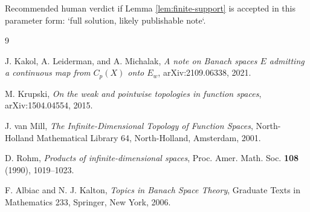 \documentclass[11pt]{article}
\begin{document}
Recommended human verdict if Lemma \ref{lem:finite-support} is accepted in
this parameter form: `full solution, likely publishable note`.

\begin{thebibliography}{9}

J. Kakol, A. Leiderman, and A. Michalak,
\emph{A note on Banach spaces $E$ admitting a continuous map from $C_p(X)$
onto $E_w$}, arXiv:2109.06338, 2021.

M. Krupski,
\emph{On the weak and pointwise topologies in function spaces},
arXiv:1504.04554, 2015.

J. van Mill,
\emph{The Infinite-Dimensional Topology of Function Spaces},
North-Holland Mathematical Library 64, North-Holland, Amsterdam, 2001.

D. Rohm,
\emph{Products of infinite-dimensional spaces},
Proc. Amer. Math. Soc. \textbf{108} (1990), 1019--1023.

F. Albiac and N. J. Kalton,
\emph{Topics in Banach Space Theory},
Graduate Texts in Mathematics 233, Springer, New York, 2006.

\end{thebibliography}
\end{document}
